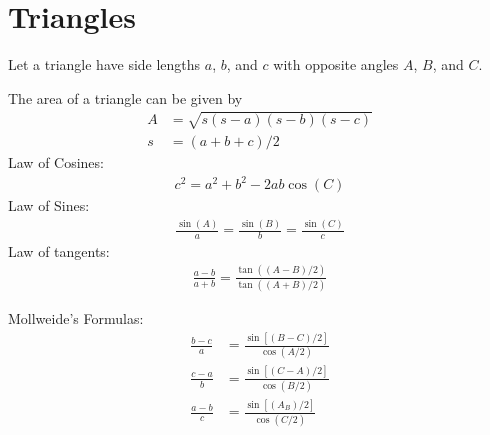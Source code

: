 \section{Triangles}
Let a triangle have side lengths $a$, $b$, and $c$ with opposite angles $A$, $B$, and $C$. 
\begin{multicols}{2}
The area of a triangle can be given by 
\begin{align}
A&=\sqrt{s(s-a)(s-b)(s-c)} \\
s&=(a+b+c)/2
\end{align}		
Law of Cosines:
\begin{align}
c^2=a^2+b^2-2ab\cos(C)
\end{align}
Law of Sines:
\begin{align}
\frac{\sin(A)}{a}=\frac{\sin(B)}{b}=\frac{\sin(C)}{c}
\end{align}
Law of tangents:
\begin{align}
\frac{a-b}{a+b}=\frac{\tan((A-B)/2)}{\tan((A+B)/2)}
\end{align}
\end{multicols}
Mollweide's Formulas:
\begin{align}
\frac{b-c}{a} &=\frac{\sin[(B-C)/2]}{\cos(A/2)} \\
\frac{c-a}{b} &=\frac{\sin[(C-A)/2]}{\cos(B/2)} \\
\frac{a-b}{c} &=\frac{\sin[(A_B)/2]}{\cos(C/2)}
\end{align}	